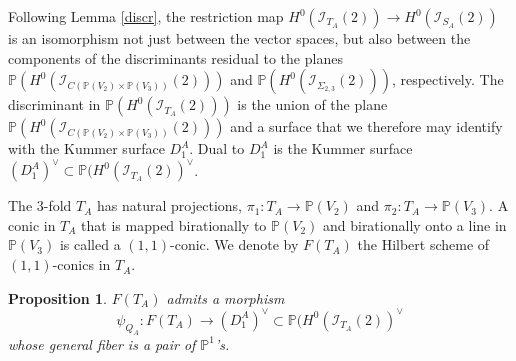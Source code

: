 \documentclass[a4paper,11pt]{amsart}
\newtheorem{prop}[thm]{Proposition}
\theoremstyle{definition}
\numberwithin{equation}{section}
\numberwithin{equation}{section} \theoremstyle{definition}
\begin{document}
Following Lemma \ref{discr},  the restriction map $H^0({\mathcal I}_{T_A}(2))\to H^0({\mathcal I}_{S_{A}}(2))$  is an isomorphism not just between the vector spaces, but also between the components of the discriminants
residual to the planes ${{\mathbb{P}}}(H^0({\mathcal I}_{C({{\mathbb{P}}}(V_2)\times {{\mathbb{P}}}(V_3))}(2)))$ and ${{\mathbb{P}}}(H^0({\mathcal I}_{\Sigma_{2,3}}(2)))$, respectively.
The discriminant in ${{\mathbb{P}}}(H^0({\mathcal I}_{T_A}(2)))$ is the union of the plane ${{\mathbb{P}}}(H^0({\mathcal I}_{C({{\mathbb{P}}}(V_2)\times {{\mathbb{P}}}(V_3))}(2)))$ and a surface that we therefore may identify with the Kummer surface $D_1^A$. Dual to $D_1^A$ is the Kummer surface $(D_1^A)^\vee\subset {{\mathbb{P}}}(H^0({\mathcal I}_{T_A}(2))^{\vee}$.

 
 The $3$-fold $T_A$ has natural projections, $\pi_1:T_A\to {{\mathbb{P}}}(V_2)$ and $\pi_2:T_A\to {{\mathbb{P}}}(V_3)$.  A conic in $T_A$ that is mapped birationally to ${{\mathbb{P}}}(V_2)$ and birationally onto a line in ${{\mathbb{P}}}(V_3)$ is called a $(1,1)$-conic.
We denote by  $F(T_A)$ the Hilbert scheme of $(1,1)$-conics in $T_A$.  
\begin{prop}\label{1.10} $F(T_A)$ admits a morphism  
\[
\psi_{Q_A}: F(T_A)\to (D_1^A)^\vee\subset {{\mathbb{P}}}(H^0({\mathcal I}_{T_A}(2))^{\vee}
\]
whose general fiber is a pair of ${{\mathbb{P}}}^1$'s.
\end{prop}
\end{document}
